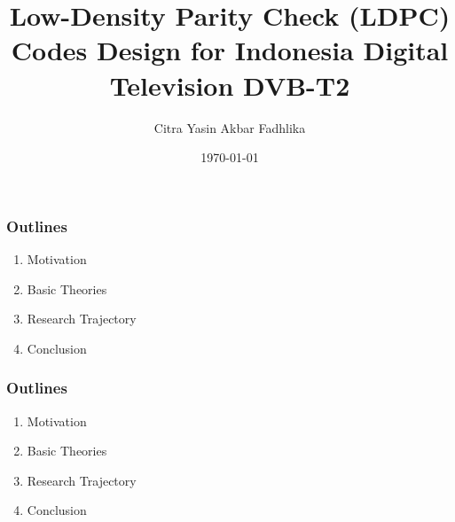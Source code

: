 \documentclass{beamer}
\title[ZEMI]{Low-Density Parity Check (LDPC) Codes Design for Indonesia Digital Television DVB-T2}
\author[Citra Yasin Akbar Fadhlika]{Citra Yasin Akbar Fadhlika }
\institute[Telkom University] %
{ 	Center for Advanced Wireless Technologies (AdWiTech),\\
	School of Electrical Engineering, Telkom University, Bandung\\
}
\date[Bandung, \today]
{ \scriptsize{\today}}
\begin{document}
\begin{frame}
  \titlepage
\end{frame}
\begin{frame}
\frametitle{Outlines}
\begin{enumerate}
\item Motivation
\item Basic Theories
\item Research Trajectory
\item Conclusion 
\end{enumerate}
\end{frame}



\begin{frame}
\frametitle{Outlines}
\begin{enumerate}
\item \alert<+> {Motivation}
\item Basic Theories
\item Research Trajectory
\item Conclusion 
\end{enumerate}
\end{frame}
\end{document}
